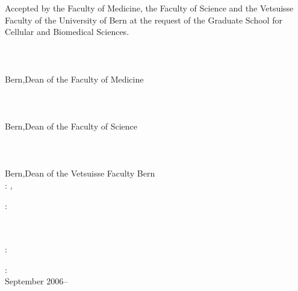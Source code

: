 \thispagestyle{empty}
Accepted by the Faculty of Medicine, the Faculty of Science and the Vetsuisse Faculty of the University of Bern at the request of the Graduate School for Cellular and Biomedical Sciences.\\
\\
\\
\\
Bern,\hfill Dean of the Faculty of Medicine\\
\\
\\
\\
Bern,\hfill Dean of the Faculty of Science\\
\\
\\
\\
Bern,\hfill Dean of the Vetsuisse Faculty Bern\\

\vfill
\noindent\myName: \textit{\myTitle,} \myDegree

\bigskip

\noindent{}: \\
\myProf \\
\myOtherProf \\ 
\mySupervisor

\medskip

\noindent{}: \\
\myLocation

\medskip

\noindent{}: \\
September 2006--\myTime
